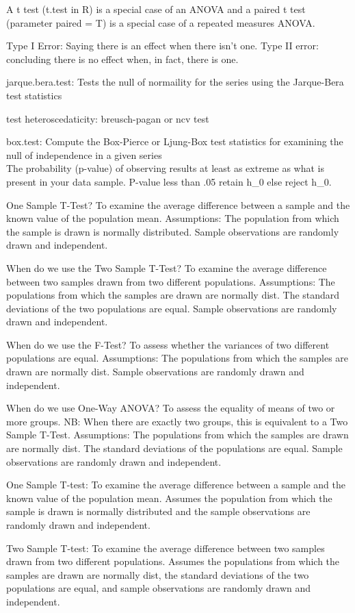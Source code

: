 \documentclass[]{book}
\begin{document}
A t test (t.test in R) is a special case of an ANOVA and a paired t test (parameter paired = T) is a special case of a repeated measures ANOVA.

Type I Error: Saying there is an effect when there isn't one. Type II error: concluding there is no effect when, in fact, there is one.

jarque.bera.test: Tests the null of normaility for the series using the Jarque-Bera test statistics

test heteroscedaticity: breusch-pagan or ncv test

box.test: Compute the Box-Pierce or Ljung-Box test statistics for examining the null of independence in a given series\\
The probability (p-value) of observing results at least as extreme as what is present in your data sample. P-value less than .05 retain h\_0 else reject h\_0.

One Sample T-Test? To examine the average difference between a sample and the known value of the population mean. Assumptions: The population from which the sample is drawn is normally distributed. Sample observations are randomly drawn and independent.

When do we use the Two Sample T-Test? To examine the average difference between two samples drawn from two different populations. Assumptions: The populations from which the samples are drawn are normally dist. The standard deviations of the two populations are equal. Sample observations are randomly drawn and independent.

When do we use the F-Test? To assess whether the variances of two different populations are equal. Assumptions: The populations from which the samples are drawn are normally dist. Sample observations are randomly drawn and independent.

When do we use One-Way ANOVA? To assess the equality of means of two or more groups. NB: When there are exactly two groups, this is equivalent to a Two Sample T-Test. Assumptions: The populations from which the samples are drawn are normally dist. The standard deviations of the populations are equal. Sample observations are randomly drawn and independent.

One Sample T-test: To examine the average difference between a sample and the known value
of the population mean. Assumes the population from which the sample is drawn is normally distributed and the sample observations are randomly drawn and independent.

Two Sample T-test: To examine the average difference between two samples drawn from two
different populations. Assumes the populations from which the samples are drawn are normally dist, the standard deviations of the two populations are equal, and sample observations are randomly drawn and independent.
\end{document}
